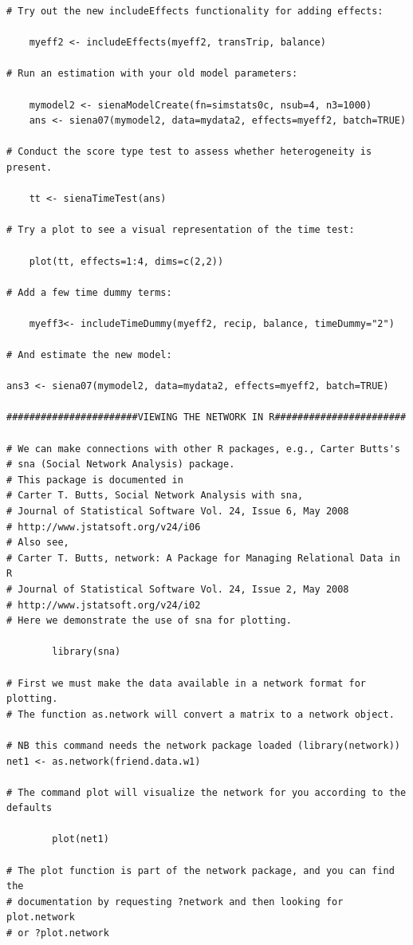 \documentclass[a4paper,fleqn]{article}
\newcommand{\+}{\, + \,}
\begin{document}
{\begin{verbatim}
# Try out the new includeEffects functionality for adding effects:

	myeff2 <- includeEffects(myeff2, transTrip, balance)

# Run an estimation with your old model parameters:

	mymodel2 <- sienaModelCreate(fn=simstats0c, nsub=4, n3=1000)
	ans <- siena07(mymodel2, data=mydata2, effects=myeff2, batch=TRUE)

# Conduct the score type test to assess whether heterogeneity is present.

	tt <- sienaTimeTest(ans)

# Try a plot to see a visual representation of the time test:

	plot(tt, effects=1:4, dims=c(2,2))

# Add a few time dummy terms:

	myeff3<- includeTimeDummy(myeff2, recip, balance, timeDummy="2")

# And estimate the new model:

ans3 <- siena07(mymodel2, data=mydata2, effects=myeff2, batch=TRUE)

#######################VIEWING THE NETWORK IN R#######################

# We can make connections with other R packages, e.g., Carter Butts's
# sna (Social Network Analysis) package.
# This package is documented in
# Carter T. Butts, Social Network Analysis with sna,
# Journal of Statistical Software Vol. 24, Issue 6, May 2008
# http://www.jstatsoft.org/v24/i06
# Also see,
# Carter T. Butts, network: A Package for Managing Relational Data in R
# Journal of Statistical Software Vol. 24, Issue 2, May 2008
# http://www.jstatsoft.org/v24/i02
# Here we demonstrate the use of sna for plotting.

        library(sna)

# First we must make the data available in a network format for plotting.
# The function as.network will convert a matrix to a network object.

# NB this command needs the network package loaded (library(network))
net1 <- as.network(friend.data.w1)

# The command plot will visualize the network for you according to the defaults

        plot(net1)

# The plot function is part of the network package, and you can find the
# documentation by requesting ?network and then looking for plot.network
# or ?plot.network


\end{verbatim}}
\end{document}
